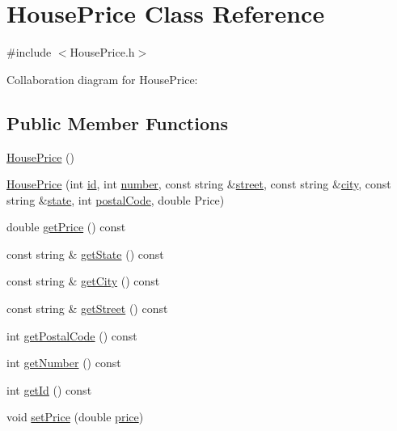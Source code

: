\hypertarget{class_house_price}{}\section{House\+Price Class Reference}
\label{class_house_price}


{\ttfamily \#include $<$House\+Price.\+h$>$}



Collaboration diagram for House\+Price\+:
\subsection*{Public Member Functions}
\begin{DoxyCompactItemize}
\item 
\hyperlink{class_house_price_adc911972c42bb19d1482fc260f339800}{House\+Price} ()
\item 
\hyperlink{class_house_price_a505a9a7d3f8bd563597110e21aefa29a}{House\+Price} (int \hyperlink{class_house_price_a6066800e48549e0b344c122fb1b9c108}{id}, int \hyperlink{class_house_price_af6ec9e5bd9c52ac029e4553290b1d183}{number}, const string \&\hyperlink{class_house_price_abceda72673b6c6c9e10c571407cdf3c2}{street}, const string \&\hyperlink{class_house_price_a3b62ff8d207b47b12850cd7ebce32b44}{city}, const string \&\hyperlink{class_house_price_a865659102def4e722908ad3e5d7f3ae4}{state}, int \hyperlink{class_house_price_a870b1e53f5d0595ffe9d693dcba0f2d1}{postal\+Code}, double Price)
\item 
double \hyperlink{class_house_price_ad8f848f687a8de39ce17abf39553a7de}{get\+Price} () const
\item 
const string \& \hyperlink{class_house_price_a345bc0afd36ca4d9fc67f3dc353a1740}{get\+State} () const
\item 
const string \& \hyperlink{class_house_price_a37f566a8640c0495a3e9f78f4e04d6d6}{get\+City} () const
\item 
const string \& \hyperlink{class_house_price_a3adb3409680a4abd01d4deed96e39cf9}{get\+Street} () const
\item 
int \hyperlink{class_house_price_aeae03b766a6d1f2ddaed8b9666d1f0c5}{get\+Postal\+Code} () const
\item 
int \hyperlink{class_house_price_a41ae809472c6b51d6545f2be4bf566ba}{get\+Number} () const
\item 
int \hyperlink{class_house_price_a17e05515a6c0477f59d4db4ebaebb778}{get\+Id} () const
\item 
void \hyperlink{class_house_price_a1a25700daee1c9e740fb265195f167c9}{set\+Price} (double \hyperlink{class_house_price_a0e69a53fa6e4a2dcc8443107eda02e9a}{price})

\end{DoxyCompactItemize}
